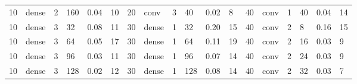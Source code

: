 \begin{table}
{\begin{tabular}{@{}llllll|llllll|llllll@{}}
10                              & dense                          & 2                              & 160                            & 0.04                             & 10                                & 20                              & conv                           & 3                              & 40                             & 0.02                           & 8                                 & 40                              & conv                           & 1                              & 40                             & 0.04                           & 14                               \\
10                              & dense                          & 3                              & 32                             & 0.08                             & 11                                & 30                              & dense                          & 1                              & 32                             & 0.20                           & 15                                & 40                              & conv                           & 2                              & 8                              & 0.16                           & 15                               \\
10                              & dense                          & 3                              & 64                             & 0.05                             & 17                                & 30                              & dense                          & 1                              & 64                             & 0.11                           & 19                                & 40                              & conv                           & 2                              & 16                             & 0.03                           & 9                                \\
10                              & dense                          & 3                              & 96                             & 0.03                             & 11                                & 30                              & dense                          & 1                              & 96                             & 0.07                           & 14                                & 40                              & conv                           & 2                              & 24                             & 0.03                           & 9                                \\
10                              & dense                          & 3                              & 128                            & 0.02                             & 12                                & 30                              & dense                          & 1                              & 128                            & 0.08                           & 14                                & 40                              & conv                           & 2                              & 32                             & 0.03                           & 7                                \\

\end{tabular}}
\end{table}
